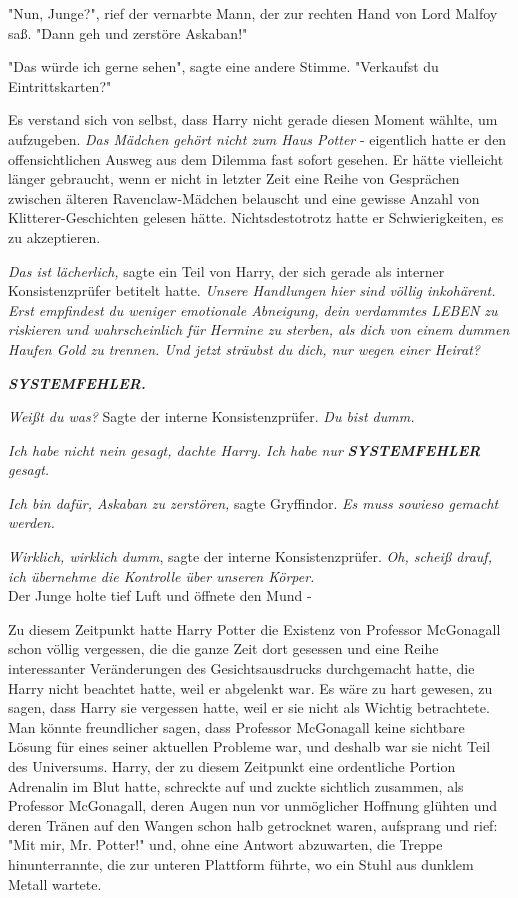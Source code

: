 {"Nun, Junge?", rief der vernarbte Mann, der zur rechten Hand von Lord Malfoy saß. "Dann geh und zerstöre Askaban!"

"Das würde ich gerne sehen", sagte eine andere Stimme. "Verkaufst du Eintrittskarten?"

Es verstand sich von selbst, dass Harry nicht gerade diesen Moment wählte, um aufzugeben. \emph{Das Mädchen gehört nicht zum Haus Potter} - eigentlich hatte er den offensichtlichen Ausweg aus dem Dilemma fast sofort gesehen. Er hätte vielleicht länger gebraucht, wenn er nicht in letzter Zeit eine Reihe von Gesprächen zwischen älteren Ravenclaw-Mädchen belauscht und eine gewisse Anzahl von Klitterer-Geschichten gelesen hätte. Nichtsdestotrotz hatte er Schwierigkeiten, es zu akzeptieren.

\emph{Das ist lächerlich,} sagte ein Teil von Harry, der sich gerade als interner Konsistenzprüfer betitelt hatte. \emph{Unsere Handlungen hier sind völlig inkohärent. Erst empfindest du weniger emotionale Abneigung, dein verdammtes LEBEN zu riskieren und wahrscheinlich für Hermine zu sterben, als dich von einem dummen Haufen Gold zu trennen. Und jetzt sträubst du dich, nur wegen einer Heirat?}

\textbf{\emph{SYSTEMFEHLER.}}

\emph{Weißt du was?} Sagte der interne Konsistenzprüfer. \emph{Du bist dumm.}

\emph{Ich habe nicht nein gesagt, dachte Harry. Ich habe nur} \textbf{\emph{SYSTEMFEHLER}} \emph{gesagt.}

\emph{Ich bin dafür, Askaban zu zerstören,} sagte Gryffindor. \emph{Es muss sowieso gemacht werden.}

\emph{Wirklich, wirklich dumm}, sagte der interne Konsistenzprüfer. \emph{Oh, scheiß drauf, ich übernehme die Kontrolle über unseren Körper.}\\ Der Junge holte tief Luft und öffnete den Mund -

Zu diesem Zeitpunkt hatte Harry Potter die Existenz von Professor McGonagall schon völlig vergessen, die die ganze Zeit dort gesessen und eine Reihe interessanter Veränderungen des Gesichtsausdrucks durchgemacht hatte, die Harry nicht beachtet hatte, weil er abgelenkt war. Es wäre zu hart gewesen, zu sagen, dass Harry sie vergessen hatte, weil er sie nicht als Wichtig betrachtete. Man könnte freundlicher sagen, dass Professor McGonagall keine sichtbare Lösung für eines seiner aktuellen Probleme war, und deshalb war sie nicht Teil des Universums. Harry, der zu diesem Zeitpunkt eine ordentliche Portion Adrenalin im Blut hatte, schreckte auf und zuckte sichtlich zusammen, als Professor McGonagall, deren Augen nun vor unmöglicher Hoffnung glühten und deren Tränen auf den Wangen schon halb getrocknet waren, aufsprang und rief: "Mit mir, Mr. Potter!" und, ohne eine Antwort abzuwarten, die Treppe hinunterrannte, die zur unteren Plattform führte, wo ein Stuhl aus dunklem Metall wartete.

}
